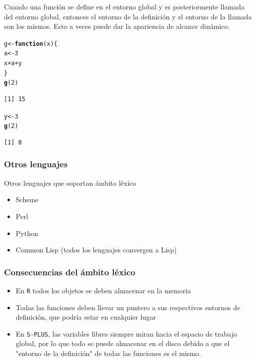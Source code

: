 \documentclass{article}\usepackage[]{graphicx}\usepackage[]{color}
\makeatletter
\newcommand{\hlnum}[1]{\textcolor[rgb]{0.686,0.059,0.569}{#1}}%
\newcommand{\hlopt}[1]{\textcolor[rgb]{0,0,0}{#1}}%
\newcommand{\hlstd}[1]{\textcolor[rgb]{0.345,0.345,0.345}{#1}}%
\newcommand{\hlkwa}[1]{\textcolor[rgb]{0.161,0.373,0.58}{\textbf{#1}}}%
\newcommand{\hlkwb}[1]{\textcolor[rgb]{0.69,0.353,0.396}{#1}}%
\newcommand{\hlkwc}[1]{\textcolor[rgb]{0.333,0.667,0.333}{#1}}%
\newcommand{\hlkwd}[1]{\textcolor[rgb]{0.737,0.353,0.396}{\textbf{#1}}}%
\newenvironment{kframe}{%
 \def\at@end@of@kframe{}%
 \ifinner\ifhmode%
  \def\at@end@of@kframe{\end{minipage}}%
  \begin{minipage}{\columnwidth}%
 \fi\fi%
 \def\FrameCommand##1{\hskip\@totalleftmargin \hskip-\fboxsep
 \colorbox{shadecolor}{##1}\hskip-\fboxsep
     \hskip-\linewidth \hskip-\@totalleftmargin \hskip\columnwidth}%
 \MakeFramed {\advance\hsize-\width
   \@totalleftmargin\z@ \linewidth\hsize
   \@setminipage}}%
 {\par\unskip\endMakeFramed%
 \at@end@of@kframe}
\newenvironment{knitrout}{}{} %
\makeatother
\begin{document}
    Cuando una función se define en el entorno global y es posteriormente llamada del entorno global, entonces el entorno de la definición y el entorno de la llamada son los mismos. Esto a veces puede dar la apariencia de alcance dinámico.
\begin{knitrout}
\color{fgcolor}\begin{kframe}
\begin{alltt}
  \hlstd{g} \hlkwb{<-} \hlkwa{function}\hlstd{(}\hlkwc{x}\hlstd{) \{}
    \hlstd{a} \hlkwb{<-} \hlnum{3}
    \hlstd{x} \hlopt{+} \hlstd{a} \hlopt{+} \hlstd{y}
  \hlstd{\}}
  \hlkwd{g}\hlstd{(}\hlnum{2}\hlstd{)}
\end{alltt}
\begin{verbatim}
[1] 15
\end{verbatim}
\begin{alltt}
  \hlstd{y} \hlkwb{<-} \hlnum{3}
  \hlkwd{g}\hlstd{(}\hlnum{2}\hlstd{)}
\end{alltt}
\begin{verbatim}
[1] 8
\end{verbatim}
\end{kframe}
\end{knitrout}

    \subsubsection{Otros lenguajes}
    Otros lenguajes que soportan ámbito léxico
    \begin{itemize}
      \item Scheme
      \item Perl
      \item Python
      \item Common Lisp (todos los lenguajes convergen a Lisp)
    \end{itemize}

    \subsubsection{Consecuencias del ámbito léxico}
    \begin{itemize}
      \item  En \texttt{R} todos los objetos se deben almacenar en la memoria
      \item Todas las funciones deben llevar un puntero a sus respectivos entornos de definición, que podría estar en cualquier lugar
      \item En \texttt{S-PLUS}, las variables libres siempre miran hacia el espacio de trabajo global, por lo que todo se puede almacenar en el disco debido a que el "entorno de la definición" de todas las funciones es el mismo.
    \end{itemize}
\end{document}

